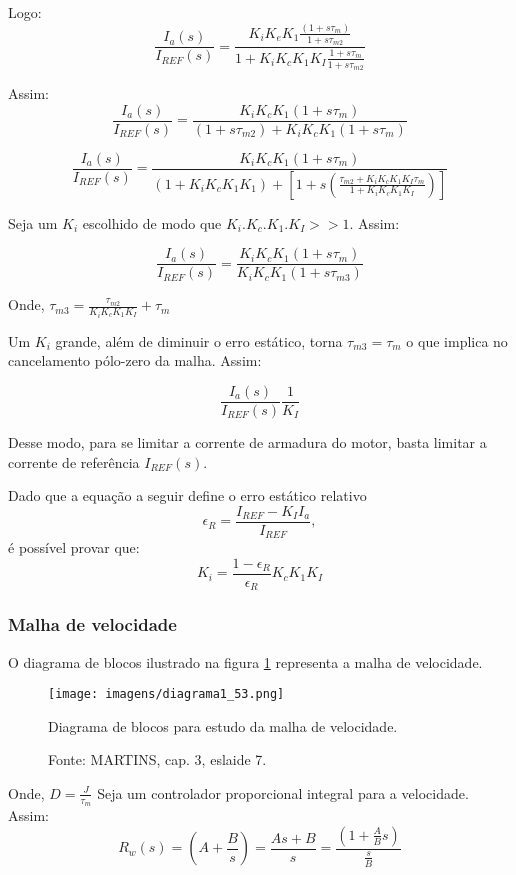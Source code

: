 Logo:
\[\frac{I_{a}(s)}{I_{REF}(s)} = \frac{K_{i}K_{e}K_{1}\frac{\left(1 + s\tau_{m}\right)}{1 + s\tau_{m2}}}{1 + K_{i}K_{c}K_{1}K_{I}\frac{1 + s\tau_{m}}{1 + s\tau_{m2}}}\]

Assim:
\[\frac{I_{a}(s)}{I_{REF}(s)} = \frac{K_{i}K_{c}K_{1}\left(1 + s\tau_{m}\right)}{\left(1 + s\tau_{m2}\right) + K_{i}K_{c}K_{1}\left(1 + s\tau_{m}\right)}\]

\[\frac{I_{a}(s)}{I_{REF}(s)} = \frac{K_{i}K_{c}K_{1}\left(1 + s\tau_{m}\right)}{\left(1 + K_{i}K_{c}K_{1}K_{1}\right) + \left[1 + s\left(\frac{\tau_{m2} + K_{i}K_{c}K_{1}K_{I}\tau_{m} }{1 + K_{i}K_{c}K_{1}K_{I}}\right)\right]}\]

Seja um $K_{i}$ escolhido de modo que $K_{i}.K_{c}.K_{1}.K_{I} >> 1$. Assim:

\[\frac{I_{a}(s)}{I_{REF}(s)} = \frac{K_{i}K_{c}K_{1}\left(1 + s\tau_{m}\right)}{ K_{i}K_{c}K_{1}\left(1 + s\tau_{m3}\right)}\]

Onde, $\tau_{m3} = \frac{\tau_{m2}}{K_{i}K_{c}K_{1}K_{I}} + \tau_{m}$

Um $K_{i}$ grande, além de diminuir o erro estático, torna $\tau_{m3} = \tau_{m}$ o que implica no cancelamento pólo-zero da malha. Assim:

\[\frac{I_{a}(s)}{I_{REF}(s)} \frac{1}{K_{I}}\]

Desse modo, para se limitar a corrente de armadura do motor, basta limitar a corrente de referência $I_{REF}(s)$. 

Dado que a equação a seguir define o erro estático relativo
\[\epsilon_{R} = \frac{I_{REF} - K_{I}I_{a}}{I_{REF}}  ,\]
é possível provar que:
\[K_{i} = \frac{1 - \epsilon_{R}}{\epsilon_{R}}K_{c}K_{1}K_{I}\]

\subsubsection{Malha de velocidade}

O diagrama de blocos ilustrado na figura \ref{fig:D1_53} representa a malha de velocidade.

\begin{figure}[ht!]
\center
\texttt{[image: imagens/diagrama1\_53.png]}
\caption{\label{fig:D1_53} Diagrama de blocos para estudo da malha de velocidade.}
\caption*{Fonte: MARTINS, cap. 3, eslaide 7.}
\end{figure}

Onde, $D = \frac{J}{\tau_{m}}$
Seja um controlador proporcional integral para a velocidade. Assim:
\[R_{w}(s) = 	\left ( A + \dfrac{B}{s} \right ) = \frac{As + B}{s} = \frac{\left(1 + \frac{A}{B}s\right)}{\frac{s}{B}}\]

